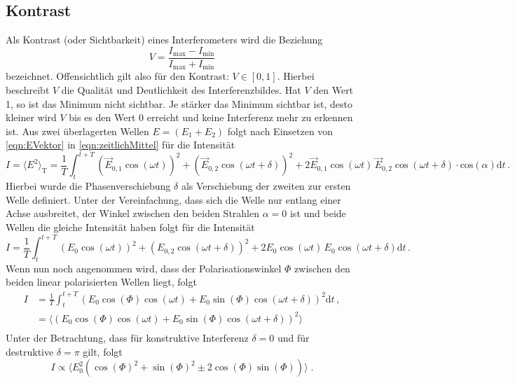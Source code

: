 \subsection{Kontrast} \label{sec:kontrast}
Als Kontrast (oder Sichtbarkeit) eines Interferometers wird die Beziehung
\begin{equation} \label{eqn:kontrast}
    V = \frac{I_\text{max} - I_\text{min}}{I_\text{max} + I_\text{min}}
\end{equation}
bezeichnet. Offensichtlich gilt also für den Kontrast: $V \in [0,1]$.
Hierbei beschreibt $V$ die Qualität und Deutlichkeit des Interferenzbildes. Hat $V$ den Wert 1, so ist das Minimum nicht sichtbar. Je stärker das Minimum sichtbar ist, desto kleiner wird $V$ bis es den Wert 0 erreicht und keine Interferenz mehr zu erkennen ist.
Aus zwei überlagerten Wellen $E=(E_1+E_2)$ folgt nach Einsetzen von \autoref{eqn:EVektor} in \autoref{eqn:zeitlichMittel} für die Intensität
\begin{equation*}
    I = \langle E^2\rangle _{\text{T}}= \frac{1}{T}\int_t^{t+T}  (\vec{E}_{0,1}\cos{(\omega t)})^2+(\vec{E}_{0,2}\cos{(\omega t+ \delta)})^2+2\vec{E}_{0,1}\cos{(\omega t)}\, \vec{E}_{0,2}\cos{(\omega t+ \delta)}\cdot\text{cos}(\alpha)\text{d}t\, .
\end{equation*}
Hierbei wurde die Phasenverschiebung $\delta$ als Verschiebung der zweiten zur ersten Welle definiert. Unter der Vereinfachung, dass sich die Welle nur entlang einer Achse ausbreitet, der Winkel zwischen den beiden Strahlen $\alpha=0$ ist und beide Wellen die gleiche Intensität haben folgt für die Intensität 
\begin{equation*}
    I=\frac{1}{T}\int_t^{t+T} (E_{0}\cos{(\omega t)})^2+(E_{0,2}\cos{(\omega t+ \delta)})^2+2E_{0}\cos{(\omega t)}\, E_{0}\cos{(\omega t+ \delta)}\text{d}t\, .
\end{equation*}
Wenn nun noch angenommen wird, dass der Polarisationswinkel $\Phi$ zwischen den beiden linear polarisierten Wellen liegt, folgt
\begin{align*}
    I&=\frac{1}{T}\int_t^{t+T} (E_{0}\cos{(\Phi)}\cos{(\omega t)}+E_{0}\sin{(\Phi)}\cos{(\omega t+ \delta)})^2\text{d}t\, ,\\
    &= \langle (E_{0}\cos{(\Phi)}\cos{(\omega t)}+E_{0}\sin{(\Phi)}\cos{(\omega t+ \delta)})^2\rangle \\
\end{align*}
Unter der Betrachtung, dass für konstruktive Interferenz $\delta = 0$ und für destruktive $\delta =\pi$ gilt, folgt
\begin{equation*}
    I\propto  \langle E_{0}^2 (\cos{(\Phi)}^2+\sin{(\Phi)}^2\pm 2\cos{(\Phi)}\sin{(\Phi)})\rangle \; .
\end{equation*}
